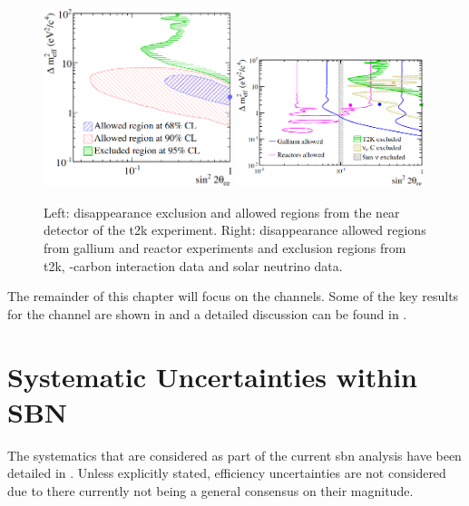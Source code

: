 \begin{figure}[!h]
    \centering
    \includegraphics[width = 0.49\textwidth, height = 0.35\textwidth]{figures-chap6/external_limits/nue_disapp_external_T2K.png}
    \includegraphics[width = 0.49\textwidth, height = 0.35\textwidth]{figures-chap6/external_limits/nue_dissap_external_combo.png}
    \caption[\nue disappearance limits from gallium and reactor experiments, the near detector of the  \gls{t2k} experiment and from \nue-carbon interaction data and solar neutrino data.]{Left: \nue disappearance exclusion and allowed regions from the near detector of the \gls{t2k} experiment. Right: \nue disappearance allowed regions from gallium and reactor experiments and exclusion regions from \gls{t2k}, \nue-carbon interaction data and solar neutrino data.}
    \label{fig:nue_disapp_external}
\end{figure}

\newpage
The remainder of this chapter will focus on the \nue channels. Some of the key results for the \numu channel are shown in  and a detailed discussion can be found in \cite{Rhiannon's_thesis}.


\newpage
\section{Systematic Uncertainties within SBN}

The systematics that are considered as part of the current \gls{sbn} analysis have been detailed in . Unless explicitly stated, efficiency uncertainties are not considered due to there currently not being a general consensus on their magnitude. 

